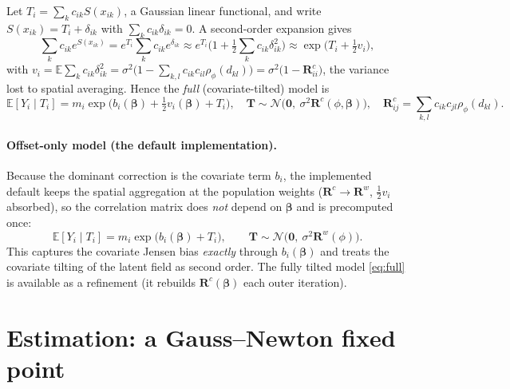 \documentclass[11pt]{article}
\newcommand{\R}{\mathbf{R}}
\newcommand{\bet}{\bm{\beta}}
\newcommand{\E}{\mathbb{E}}
\begin{document}
Let $T_i=\sum_k c_{ik}S(x_{ik})$, a Gaussian linear functional, and write
$S(x_{ik})=T_i+\delta_{ik}$ with $\sum_k c_{ik}\delta_{ik}=0$. A second-order
expansion gives
\begin{equation}
\sum_k c_{ik}e^{S(x_{ik})}=e^{T_i}\sum_k c_{ik}e^{\delta_{ik}}
\approx e^{T_i}\Big(1+\tfrac12\sum_k c_{ik}\delta_{ik}^2\Big)
\approx \exp\!\big(T_i+\tfrac12 v_i\big),
\end{equation}
with $v_i=\E\sum_k c_{ik}\delta_{ik}^2=\sigma^2\big(1-\sum_{k,l}c_{ik}c_{il}\rho_\phi(d_{kl})\big)
=\sigma^2\big(1-\R^c_{ii}\big)$, the variance lost to spatial averaging. Hence the
\emph{full} (covariate-tilted) model is
\begin{equation}
\E[Y_i\mid T_i]= m_i\exp\!\big(b_i(\bet)+\tfrac12 v_i(\bet)+T_i\big),
\quad
\mathbf{T}\sim\mathcal N\!\big(\mathbf 0,\ \sigma^2\R^c(\phi,\bet)\big),
\quad
\R^c_{ij}=\sum_{k,l}c_{ik}c_{jl}\rho_\phi(d_{kl}).
\label{eq:full}
\end{equation}

\paragraph{Offset-only model (the default implementation).}
Because the dominant correction is the covariate term $b_i$, the implemented
default keeps the spatial aggregation at the population weights
($\R^c\!\to\!\R^w$, $\tfrac12 v_i$ absorbed), so the correlation matrix does
\emph{not} depend on $\bet$ and is precomputed once:
\begin{equation}
\E[Y_i\mid T_i]= m_i\exp\!\big(b_i(\bet)+T_i\big),
\qquad
\mathbf T\sim\mathcal N\!\big(\mathbf 0,\ \sigma^2\R^w(\phi)\big).
\label{eq:offset}
\end{equation}
This captures the covariate Jensen bias \emph{exactly} through $b_i(\bet)$ and
treats the covariate tilting of the latent field as second order. The fully tilted
model \eqref{eq:full} is available as a refinement (it rebuilds $\R^c(\bet)$ each
outer iteration).

\section{Estimation: a Gauss--Newton fixed point}
\end{document}
